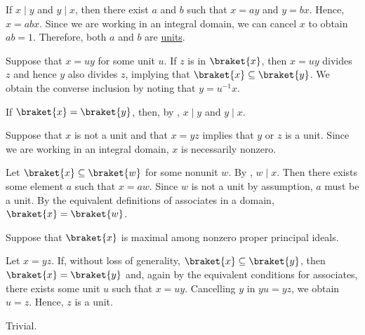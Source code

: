 \begin{defproof}
   If \( x \mid y \) and \( y \mid x \), then there exist \( a \) and \( b \) such that \( x = ay \) and \( y = bx \). Hence, \( x = abx \). Since we are working in an integral domain, we can cancel \( x \) to obtain \( ab = 1 \). Therefore, both \( a \) and \( b \) are \hyperref[def:divisibility/unit]{units}.

   Suppose that \( x = uy \) for some unit \( u \). If \( z \) is in \( \braket{ x } \), then \( x = uy \) divides \( z \) and hence \( y \) also divides \( z \), implying that \( \braket{ x } \subseteq \braket{ y } \). We obtain the converse inclusion by noting that \( y = u^{-1} x \).

   If \( \braket{ x } = \braket{ y } \), then, by , \( x \mid y \) and \( y \mid x \).

   Suppose that \( x \) is not a unit and that \( x = yz \) implies that \( y \) or \( z \) is a unit. Since we are working in an integral domain, \( x \) is necessarily nonzero.

  Let \( \braket{ x } \subseteq \braket{ w } \) for some nonunit \( w \). By , \( w \mid x \). Then there exists some element \( a \) such that \( x = aw \). Since \( w \) is not a unit by assumption, \( a \) must be a unit. By the equivalent definitions of associates in a domain, \( \braket{ x } = \braket{ w } \).

   Suppose that \( \braket{ x } \) is maximal among nonzero proper principal ideals.

  Let \( x = yz \). If, without loss of generality, \( \braket{ x } \subseteq \braket{ y } \), then \( \braket{ x } = \braket{ y } \) and, again by the equivalent conditions for associates, there exists some unit \( u \) such that \( x = uy \). Cancelling \( y \) in \( yu = yz \), we obtain \( u = z \). Hence, \( z \) is a unit.

   Trivial.
\end{defproof}

